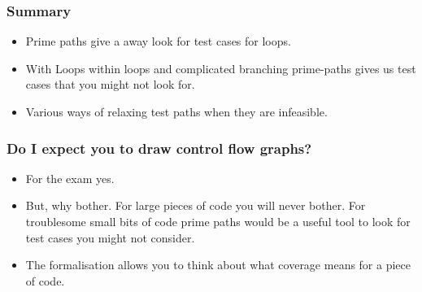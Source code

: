 \documentclass[handout]{beamer}
\begin{document}
\begin{frame}
  \frametitle{Summary}

  \begin{itemize}
  \item  Prime paths give a away look for test cases for loops.
  \item  With Loops within loops and complicated branching prime-paths gives
    us test cases that you might not look for.
  \item Various ways of relaxing test paths when they are infeasible.
  \end{itemize}
\end{frame}

\begin{frame}
  \frametitle{Do I expect you to draw control flow graphs?}
  \begin{itemize}
  \item For the exam yes. 
  \item But, why bother. For large pieces of code you will never bother. For
    troublesome small bits of code prime paths would be a useful tool to look
    for test cases you might not consider.
  \item The formalisation allows you to think about what coverage means for a
    piece of code.
  \end{itemize}
\end{frame}
\end{document}
